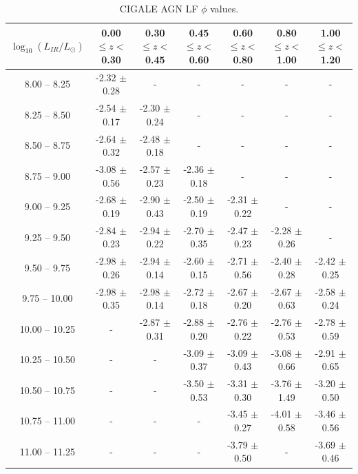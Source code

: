 \begin{table}
    \begin{center}
    \caption{CIGALE AGN LF $\phi$ values.}
    \label{Tab: CG AGN LF}
    \begin{tabular}{@{}ccccccc@{}}
        \toprule
        $\log_{10}(L_{IR}/L_{\odot})$ & 0.00 $\leq z <$ 0.30 & 0.30 $\leq z <$ 0.45 & 0.45 $\leq z <$ 0.60 & 0.60 $\leq z <$ 0.80 & 0.80 $\leq z <$ 1.00 & 1.00 $\leq z <$ 1.20 \\
        \hline
         8.00 --  8.25 & -2.32 $\pm$ 0.28 & -                & -                & -                & -                & - \\
         8.25 --  8.50 & -2.54 $\pm$ 0.17 & -2.30 $\pm$ 0.24 & -                & -                & -                & - \\
         8.50 --  8.75 & -2.64 $\pm$ 0.32 & -2.48 $\pm$ 0.18 & -                & -                & -                & - \\
         8.75 --  9.00 & -3.08 $\pm$ 0.56 & -2.57 $\pm$ 0.23 & -2.36 $\pm$ 0.18 & -                & -                & - \\
         9.00 --  9.25 & -2.68 $\pm$ 0.19 & -2.90 $\pm$ 0.43 & -2.50 $\pm$ 0.19 & -2.31 $\pm$ 0.22 & -                & - \\
         9.25 --  9.50 & -2.84 $\pm$ 0.23 & -2.94 $\pm$ 0.22 & -2.70 $\pm$ 0.35 & -2.47 $\pm$ 0.23 & -2.28 $\pm$ 0.26 & - \\
         9.50 --  9.75 & -2.98 $\pm$ 0.26 & -2.94 $\pm$ 0.14 & -2.60 $\pm$ 0.15 & -2.71 $\pm$ 0.56 & -2.40 $\pm$ 0.28 & -2.42 $\pm$ 0.25 \\
         9.75 -- 10.00 & -2.98 $\pm$ 0.35 & -2.98 $\pm$ 0.14 & -2.72 $\pm$ 0.18 & -2.67 $\pm$ 0.20 & -2.67 $\pm$ 0.63 & -2.58 $\pm$ 0.24 \\
        10.00 -- 10.25 & -                & -2.87 $\pm$ 0.31 & -2.88 $\pm$ 0.20 & -2.76 $\pm$ 0.22 & -2.76 $\pm$ 0.53 & -2.78 $\pm$ 0.59 \\
        10.25 -- 10.50 & -                & -                & -3.09 $\pm$ 0.37 & -3.09 $\pm$ 0.43 & -3.08 $\pm$ 0.66 & -2.91 $\pm$ 0.65 \\
        10.50 -- 10.75 & -                & -                & -3.50 $\pm$ 0.53 & -3.31 $\pm$ 0.30 & -3.76 $\pm$ 1.49 & -3.20 $\pm$ 0.50 \\
        10.75 -- 11.00 & -                & -                & -                & -3.45 $\pm$ 0.27 & -4.01 $\pm$ 0.58 & -3.46 $\pm$ 0.56 \\
        11.00 -- 11.25 & -                & -                & -                & -3.79 $\pm$ 0.50 & -                & -3.69 $\pm$ 0.46 \\

\end{tabular}
\end{center}
\end{table}

